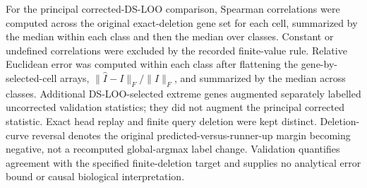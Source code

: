 For the principal corrected-DS-LOO comparison, Spearman correlations were computed across the original exact-deletion gene set for each cell, summarized by the median within each class and then the median over classes. Constant or undefined correlations were excluded by the recorded finite-value rule. Relative Euclidean error was computed within each class after flattening the gene-by-selected-cell arrays, $\|\widehat I-I\|_F/\|I\|_F$, and summarized by the median across classes. Additional DS-LOO-selected extreme genes augmented separately labelled uncorrected validation statistics; they did not augment the principal corrected statistic. Exact head replay and finite query deletion were kept distinct. Deletion-curve reversal denotes the original predicted-versus-runner-up margin becoming negative, not a recomputed global-argmax label change. Validation quantifies agreement with the specified finite-deletion target and supplies no analytical error bound or causal biological interpretation.
